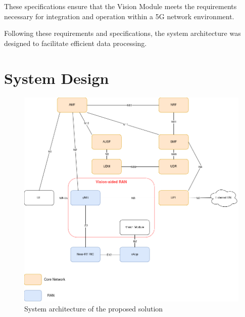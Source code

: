 \begin{table}[H]
\caption{System specifications.}
\label{tab:spec}
\centering
{}
\end{table}

These specifications ensure that the Vision Module meets the requirements necessary for integration and operation within a 5G network environment.


Following these requirements and specifications, the system architecture was designed to facilitate efficient data processing.

\section{System Design}\label{sec:design}

\begin{figure}[H]
    \centering
    \includegraphics[width=0.7\linewidth]{figures/Syst_Arch.drawio}
    \caption[System architecture of the proposed solution]{System architecture of the proposed solution}
    \label{fig:my_arch}
\end{figure}

